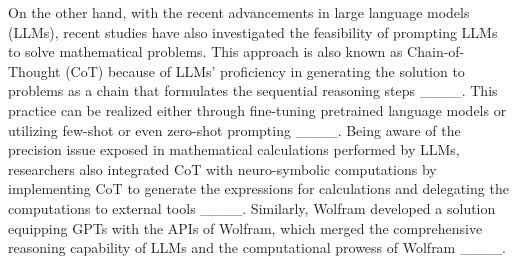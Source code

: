 On the other hand, with the recent advancements in large language models (LLMs), recent studies have also investigated the feasibility of prompting LLMs to solve mathematical problems. 
This approach is also known as Chain-of-Thought (CoT) because of LLMs' proficiency in generating the solution to problems as a chain that formulates the sequential reasoning steps ____.
This practice can be realized either through fine-tuning pretrained language models or utilizing few-shot or even zero-shot prompting ____.
% 
Being aware of the precision issue exposed in mathematical calculations performed by LLMs, researchers also integrated CoT with neuro-symbolic computations by implementing CoT to generate the expressions for calculations and delegating the computations to external tools ____.
Similarly, Wolfram developed a solution equipping GPTs with the APIs of Wolfram, which merged the comprehensive reasoning capability of LLMs and the computational prowess of Wolfram ____.